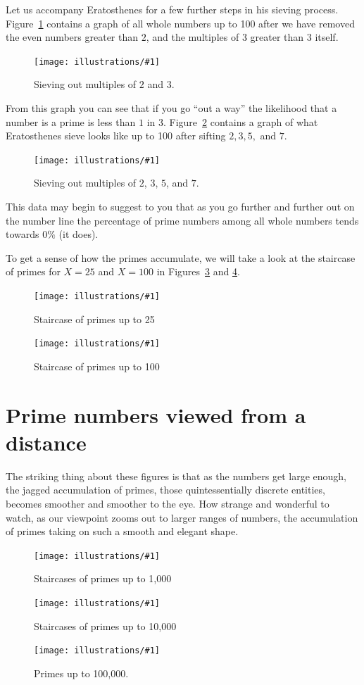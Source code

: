 \documentclass[openany]{book}
\newcommand{\ill}[3]{%
   \begin{figure}[H]%
   \vspace{-2ex}
   \centering%
   \texttt{[image: illustrations/\#1]}%
   \caption{#3}%
   \vspace{-2ex}
    \end{figure}}
\theoremstyle{plain}
\theoremstyle{definition}
\begin{document}
Let us accompany Eratosthenes for a few further steps in his sieving
process.  Figure~\ref{fig:sieve3_100} contains a graph of all whole
numbers up to 100 after we have removed the even numbers greater than
$2$, and the multiples of $3$ greater than $3$ itself.


\ill{sieves3_100}{.7}{Sieving out multiples of $2$ and $3$.\label{fig:sieve3_100}}


From this graph you can see that if you go ``out a way'' the
likelihood that a number is a prime is less than $1$ in $3
$. Figure~\ref{fig:sieve7_100} contains a graph of what Eratosthenes
sieve looks like up to 100 after sifting $2,3,5,$ and $7$.



\ill{sieves7_100}{.7}{Sieving out multiples of $2$, $3$, $5$, and $7$.\label{fig:sieve7_100}}


This data may begin to suggest to you that as you go further and
further out on the number line the percentage of prime numbers among
all whole numbers tends towards $0\%$ (it does).


To get a sense of how the primes accumulate, we will take a look at
the staircase of primes for $X= 25$ and $X=100$ in Figures~\ref{fig:staircase25}
and \ref{fig:staircase100a}.

\ill{prime_pi_25_aspect1}{.8}{Staircase of primes up to 25\label{fig:staircase25}}
\ill{prime_pi_100_aspect1}{.8}{Staircase of primes up to 100\label{fig:staircase100a}}



\chapter{Prime numbers viewed from a distance}
The striking thing about these figures is that as the numbers get
large enough, the jagged accumulation of primes, those
quintessentially discrete entities, becomes smoother and smoother to
the eye. How strange and wonderful to watch, as our viewpoint zooms
out to larger ranges of numbers, the accumulation of primes taking on
such a smooth and elegant shape.

\ill{prime_pi_1000}{.8}{Staircases of primes up to 1,000\label{fig:staircases2}}
\ill{prime_pi_10000}{.8}{Staircases of primes up to  10{,}000\label{fig:staircases2b}}

\ill{prime_pi_100000}{.8}{Primes up to 100{,}000\label{fig:pn100000}.}
\end{document}
